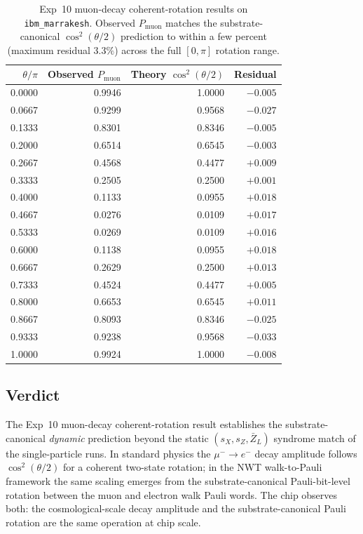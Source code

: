 \documentclass[11pt]{article}
\newcommand{\barZ}{\bar Z_L}
\begin{document}
\begin{table}[h]
\centering
\caption{Exp~10 muon-decay coherent-rotation results on \texttt{ibm\_marrakesh}.  Observed $P_\text{muon}$ matches the substrate-canonical $\cos^2(\theta/2)$ prediction to within a few percent (maximum residual $3.3\%$) across the full $[0, \pi]$ rotation range.}
\label{tab:exp10-results}
\small
\begin{tabular}{rrrr}
\toprule
$\theta / \pi$ & Observed $P_\text{muon}$ & Theory $\cos^2(\theta/2)$ & Residual \\
\midrule
0.0000 & 0.9946 & 1.0000 & $-0.005$ \\
0.0667 & 0.9299 & 0.9568 & $-0.027$ \\
0.1333 & 0.8301 & 0.8346 & $-0.005$ \\
0.2000 & 0.6514 & 0.6545 & $-0.003$ \\
0.2667 & 0.4568 & 0.4477 & $+0.009$ \\
0.3333 & 0.2505 & 0.2500 & $+0.001$ \\
0.4000 & 0.1133 & 0.0955 & $+0.018$ \\
0.4667 & 0.0276 & 0.0109 & $+0.017$ \\
0.5333 & 0.0269 & 0.0109 & $+0.016$ \\
0.6000 & 0.1138 & 0.0955 & $+0.018$ \\
0.6667 & 0.2629 & 0.2500 & $+0.013$ \\
0.7333 & 0.4524 & 0.4477 & $+0.005$ \\
0.8000 & 0.6653 & 0.6545 & $+0.011$ \\
0.8667 & 0.8093 & 0.8346 & $-0.025$ \\
0.9333 & 0.9238 & 0.9568 & $-0.033$ \\
1.0000 & 0.9924 & 1.0000 & $-0.008$ \\
\bottomrule
\end{tabular}
\end{table}

\subsection{Verdict}
\label{sec:exp10-verdict}

The Exp~10 muon-decay coherent-rotation result establishes the substrate-canonical \emph{dynamic} prediction beyond the static $(s_X, s_Z, \barZ)$ syndrome match of the single-particle runs.  In standard physics the $\mu^- \to e^-$ decay amplitude follows $\cos^2(\theta/2)$ for a coherent two-state rotation; in the NWT walk-to-Pauli framework the same scaling emerges from the substrate-canonical Pauli-bit-level rotation between the muon and electron walk Pauli words.  The chip observes both: the cosmological-scale decay amplitude and the substrate-canonical Pauli rotation are the same operation at chip scale.
\end{document}
